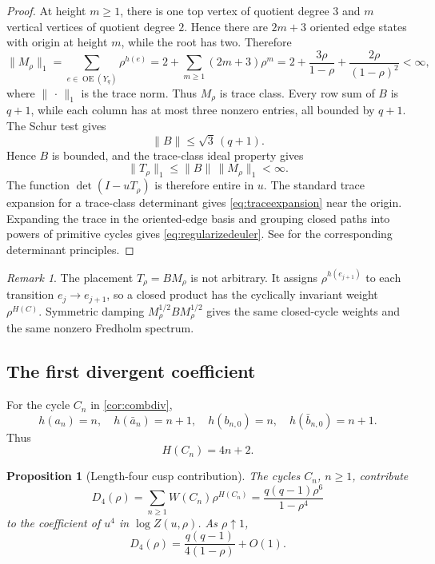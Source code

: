 \documentclass[11pt,reqno]{amsart}
\numberwithin{equation}{section}
\newtheorem{proposition}[theorem]{Proposition}
\theoremstyle{definition}
\theoremstyle{remark}
\newtheorem{remark}[theorem]{Remark}
\newcommand{\OrE}{\operatorname{OE}}
\begin{document}
\begin{proof}
At height $m\ge1$, there is one top vertex of quotient degree $3$ and $m$
vertical vertices of quotient degree $2$.  Hence there are $2m+3$ oriented
edge states with origin at height $m$, while the root has two.  Therefore
\begin{equation}\label{eq:Mtrace}
 \|M_\rho\|_1
 =\sum_{e\in\OrE(Y_q)}\rho^{h(e)}
 =2+\sum_{m\ge1}(2m+3)\rho^m
 =2+\frac{3\rho}{1-\rho}+\frac{2\rho}{(1-\rho)^2}<\infty,
\end{equation}
where $\|\,\cdot\,\|_1$ is the trace norm.  Thus $M_\rho$ is trace class.
Every row sum of $B$ is $q+1$, while each column has at most three nonzero
entries, all bounded by $q+1$.  The Schur test gives
\[
 \|B\|\le\sqrt3\,(q+1).
\]
Hence $B$ is bounded, and the trace-class ideal property gives
\[
 \|T_\rho\|_1\le\|B\|\,\|M_\rho\|_1<\infty.
\]
The function $\det(I-uT_\rho)$ is therefore entire in $u$.  The standard trace
expansion for a trace-class determinant gives \eqref{eq:traceexpansion} near
the origin.  Expanding the trace in the oriented-edge basis and grouping
closed paths into powers of primitive cycles gives
\eqref{eq:regularizedeuler}.  See \cite{Simon2005,Deitmar2015} for the
corresponding determinant principles.
\end{proof}

\begin{remark}
The placement $T_\rho=BM_\rho$ is not arbitrary.  It assigns
$\rho^{h(e_{j+1})}$ to each transition $e_j\to e_{j+1}$, so a closed product
has the cyclically invariant weight $\rho^{H(C)}$.  Symmetric damping
$M_\rho^{1/2}BM_\rho^{1/2}$ gives the same closed-cycle weights and the same
nonzero Fredholm spectrum.
\end{remark}
\subsection{The first divergent coefficient}

For the cycle $C_n$ in \cref{cor:combdiv},
\[
 h(a_n)=n,\quad h(\bar a_n)=n+1,
 \quad h(b_{n,0})=n,\quad h(\bar b_{n,0})=n+1.
\]
Thus
\begin{equation}\label{eq:Cnheight}
 H(C_n)=4n+2.
\end{equation}

\begin{proposition}[Length-four cusp contribution]\label{prop:D4}
The cycles $C_n$, $n\ge1$, contribute
\begin{equation}\label{eq:D4}
 D_4(\rho)
 =\sum_{n\ge1}W(C_n)\rho^{H(C_n)}
 =\frac{q(q-1)\rho^6}{1-\rho^4}
\end{equation}
to the coefficient of $u^4$ in $\log Z(u,\rho)$.  As $\rho\uparrow1$,
\begin{equation}\label{eq:D4asymp}
 D_4(\rho)=\frac{q(q-1)}{4(1-\rho)}+O(1).
\end{equation}
\end{proposition}
\end{document}
